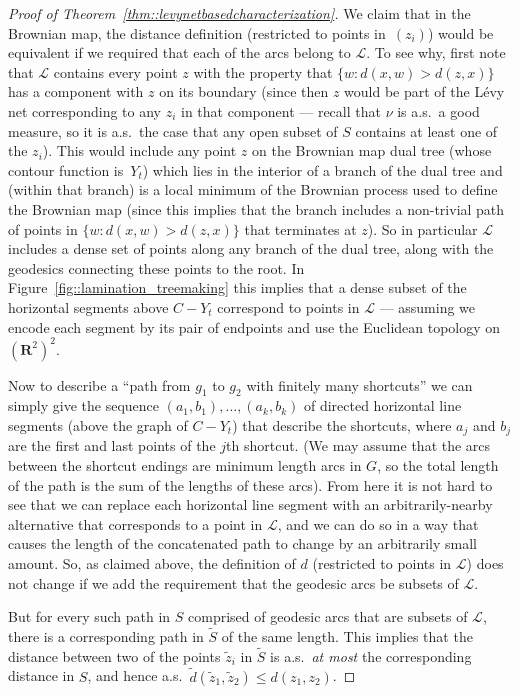 \documentclass[10pt]{amsart}
\let\mathcal\mathscr
\theoremstyle{plain}
\numberwithin{theorem}{section}
\theoremstyle{definition}
\newcommand{\R}{\mathbf{R}}
\let\wt\widetilde
\begin{document}
\begin{proof}[Proof of Theorem~\ref{thm::levynetbasedcharacterization}]
We claim that in the Brownian map, the distance definition (restricted to points in~$(z_i)$) would be equivalent if we required that each of the arcs belong to $\mathcal L$. To see why, first note that $\mathcal L$ contains every point $z$ with the property that $\{ w : d(x,w) > d(z,x)\}$ has a component with $z$ on its boundary (since then $z$ would be part of the Lévy net corresponding to any $z_i$ in that component --- recall that $\nu$ is a.s.\ a good measure, so it is a.s.\ the case that any open subset of $S$ contains at least one of the $z_i$). This would include any point $z$ on the Brownian map dual tree (whose contour function is~$Y_t$) which lies in the interior of a branch of the dual tree and (within that branch) is a local minimum of the Brownian process used to define the Brownian map (since this implies that the branch includes a non-trivial path of points in $\{ w : d(x,w) > d(z,x)\}$ that terminates at $z$). So in particular $\mathcal L$ includes a dense set of points along any branch of the dual tree, along with the geodesics connecting these points to the root. In Figure~\ref{fig::lamination_treemaking} this implies that a dense subset of the horizontal segments above $C-Y_t$ correspond to points in $\mathcal L$ --- assuming we encode each segment by its pair of endpoints and use the Euclidean topology on $(\R^2)^2$.

Now to describe a ``path from $g_1$ to $g_2$ with finitely many shortcuts'' we can simply give the sequence $(a_1,b_1), \ldots, (a_k,b_k)$ of directed horizontal line segments (above the graph of $C-Y_t$) that describe the shortcuts, where $a_j$ and $b_j$ are the first and last points of the $j$th shortcut. (We may assume that the arcs between the shortcut endings are minimum length arcs in $G$, so the total length of the path is the sum of the lengths of these arcs). From here it is not hard to see that we can replace each horizontal line segment with an arbitrarily-nearby alternative that corresponds to a point in $\mathcal L$, and we can do so in a way that causes the length of the concatenated path to change by an arbitrarily small amount. So, as claimed above, the definition of $d$ (restricted to points in $\mathcal L$) does not change if we add the requirement that the geodesic arcs be subsets of $\mathcal L$.

But for every such path in $S$ comprised of geodesic arcs that are subsets of $\mathcal L$, there is a corresponding path in $\wt{S}$ of the same length. This implies that the distance between two of the points $\wt{z}_i$ in $\wt{S}$ is a.s.\ \emph{at most} the corresponding distance in $S$, and hence a.s.\ $\wt{d}(\wt{z}_1,\wt{z}_2) \leq d(z_1,z_2)$.


\end{proof}
\end{document}
